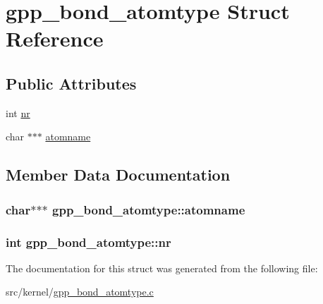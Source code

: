 \hypertarget{structgpp__bond__atomtype}{\section{gpp\-\_\-bond\-\_\-atomtype \-Struct \-Reference}
\label{structgpp__bond__atomtype}
}
\subsection*{\-Public \-Attributes}
\begin{DoxyCompactItemize}
\item 
int \hyperlink{structgpp__bond__atomtype_a03ebf949921f7698f005bb205dcaec7c}{nr}
\item 
char $\ast$$\ast$$\ast$ \hyperlink{structgpp__bond__atomtype_acfcc92ebc8bc4f63f22aada080acf9b0}{atomname}
\end{DoxyCompactItemize}


\subsection{\-Member \-Data \-Documentation}
\hypertarget{structgpp__bond__atomtype_acfcc92ebc8bc4f63f22aada080acf9b0}{
\subsubsection[{atomname}]{\setlength{\rightskip}{0pt plus 5cm}char$\ast$$\ast$$\ast$ {\bf gpp\-\_\-bond\-\_\-atomtype\-::atomname}}}\label{structgpp__bond__atomtype_acfcc92ebc8bc4f63f22aada080acf9b0}
\hypertarget{structgpp__bond__atomtype_a03ebf949921f7698f005bb205dcaec7c}{
\subsubsection[{nr}]{\setlength{\rightskip}{0pt plus 5cm}int {\bf gpp\-\_\-bond\-\_\-atomtype\-::nr}}}\label{structgpp__bond__atomtype_a03ebf949921f7698f005bb205dcaec7c}


\-The documentation for this struct was generated from the following file\-:\begin{DoxyCompactItemize}
\item 
src/kernel/\hyperlink{gpp__bond__atomtype_8c}{gpp\-\_\-bond\-\_\-atomtype.\-c}\end{DoxyCompactItemize}
